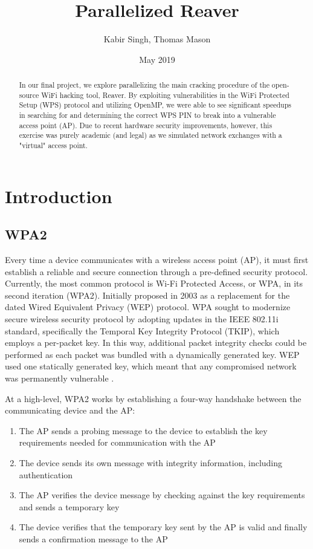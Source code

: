 \documentclass[a4paper]{article}
\title{Parallelized Reaver}
\author{Kabir Singh, Thomas Mason}
\date{May 2019}
\begin{document}
\maketitle

\begin{abstract}
In our final project, we explore parallelizing the main cracking procedure of the
open-source WiFi hacking tool, Reaver. By exploiting vulnerabilities in the WiFi Protected
Setup (WPS) protocol and utilizing OpenMP, we were able to see significant speedups in
searching for and determining the correct WPS PIN to break into a vulnerable access point (AP).
Due to recent hardware security improvements, however, this exercise was purely academic (and legal)
as we simulated network exchanges with a "virtual" access point.
\end{abstract}


\section{Introduction}

\subsection{WPA2}
Every time a device communicates with a wireless access point (AP), it must first
establish a reliable and secure connection through a pre-defined security protocol.
Currently, the most common protocol is Wi-Fi Protected Access, or WPA, in its
second iteration (WPA2). Initially proposed in 2003 as a replacement for the 
dated Wired Equivalent Privacy (WEP) protocol. WPA sought to modernize secure wireless
security protocol by adopting updates in the IEEE 802.11i standard, specifically
the Temporal Key Integrity Protocol (TKIP), which employs a per-packet key. In this way,
additional packet integrity checks could be performed as each packet was bundled
with a dynamically generated key. WEP used one statically generated key, which meant that
any compromised network was permanently vulnerable \cite{mustafa}.

At a high-level, WPA2 works by establishing a four-way handshake between the communicating
device and the AP: 

\begin{enumerate}
    \item The AP sends a probing message to the device to establish the key requirements needed for communication with the AP
    \item The device sends its own message with integrity information, including authentication
    \item The AP verifies the device message by checking against the key requirements and sends a temporary key
    \item The device verifies that the temporary key sent by the AP is valid and finally sends a confirmation message to the AP
\end{enumerate}
\end{document}
